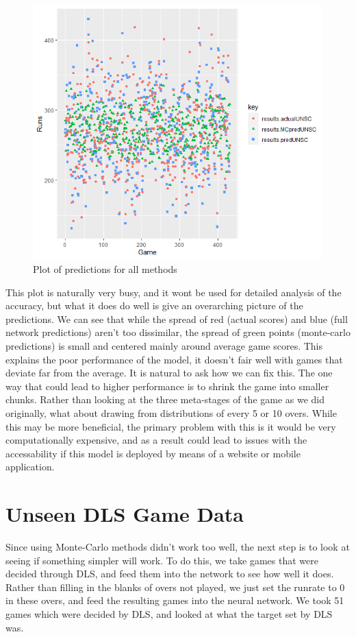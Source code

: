 \begin{figure}[h]
    \label{fullPredDist}
    \centering
    \caption{Plot of predictions for all methods}
    \includegraphics[scale=0.6]{figures/fullPredDist.png}
\end{figure}

This plot is naturally very busy, and it wont be used for detailed analysis of the accuracy, but what it does do well is give an overarching picture of the predictions. 
We can see that while the spread of red (actual scores) and blue (full network predictions) aren't too dissimilar, the spread of green points (monte-carlo predictions) is small and centered mainly 
around average game scores. This explains the poor performance of the model, it doesn't fair well with games that deviate far from the average. It is natural to ask how we can fix this. The one way that 
could lead to higher performance is to shrink the game into smaller chunks. Rather than looking at the three meta-stages of the game as we did originally, what about drawing from distributions of every 5 or 10 overs.
While this may be more beneficial, the primary problem with this is it would be very computationally expensive, and as a result could lead to issues with the accessability if this model is deployed 
by means of a website or mobile application. 

\section{Unseen DLS Game Data}
Since using Monte-Carlo methods didn't work too well, the next step is to look at seeing if something simpler will work. To do this, we take games that were decided through DLS, and 
feed them into the network to see how well it does. Rather than filling in the blanks of overs not played, we just set the runrate to 0 in these overs, and feed the resulting games into the neural network. 
We took 51 games which were decided by DLS, and looked at what the target set by DLS was. \\

